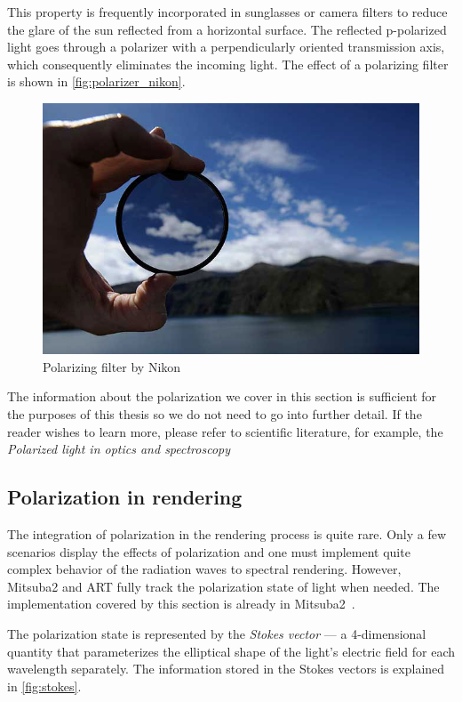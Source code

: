This property is frequently incorporated in sunglasses or camera filters to reduce the glare of the sun reflected from a horizontal surface. The reflected p-polarized light goes through a polarizer with a perpendicularly oriented transmission axis, which consequently eliminates the incoming light. The effect of a polarizing filter is shown in \autoref{fig:polarizer_nikon}.

\begin{figure}[h]
	\centering
	\includegraphics[width=.7\linewidth]{img/polarizer_nikon.jpg}
	\caption[nikon]{Polarizing filter by Nikon\footnotemark}
	\label{fig:polarizer_nikon}
\end{figure}

The information about the polarization we cover in this section is sufficient for the purposes of this thesis so we do not need to go into further detail. If the reader wishes to learn more, please refer to scientific literature, for example, the \emph{Polarized light in optics and spectroscopy}~\cite{kliger2012polarized}

\subsection{Polarization in rendering}
The integration of polarization in the rendering process is quite rare. Only a few scenarios display the effects of polarization and one must implement quite complex behavior of the radiation waves to spectral rendering. However, Mitsuba2 and ART fully track the polarization state of light when needed. The implementation covered by this section is already in Mitsuba2~\cite{mitsubaWeb}.

The polarization state is represented by the \emph{Stokes vector} --- a 4-dimensional quantity that parameterizes the elliptical shape of the light's electric field for each wavelength separately. The information stored in the Stokes vectors is explained in \autoref{fig:stokes}.

